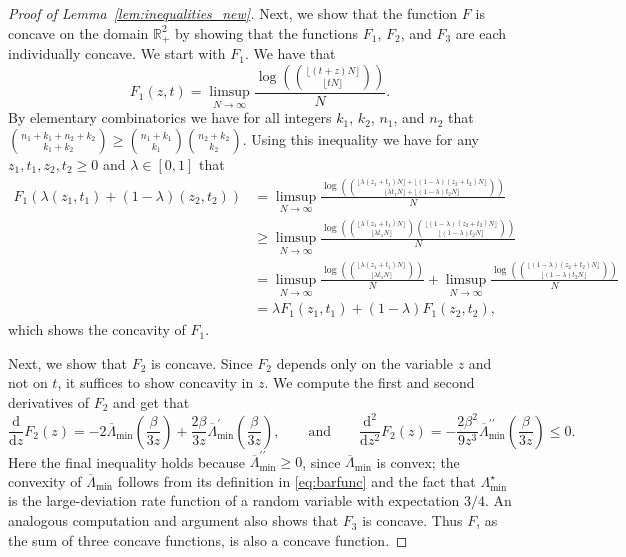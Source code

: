 \documentclass[11pt]{article}
\numberwithin{equation}{section}
\newcommand{\dd}{\mathrm d}
\theoremstyle{definition}
\begin{document}
\begin{proof}[Proof of Lemma~\ref{lem:inequalities_new}]
Next, we show that the function $F$ is concave on the domain $\mathbb{R}_{+}^{2}$ by showing that the functions $F_{1}$, $F_{2}$, and $F_{3}$ are each individually concave. 
We start with $F_{1}$. 
We have that
    \begin{equation*}
        F_1(z,t) = \limsup_{N\to \infty} \frac{\log \left(\binom{\lfloor (t+z)N \rfloor}{\lfloor tN \rfloor} \right)}{N}.
    \end{equation*}
    By elementary combinatorics we have for all integers $k_1$, $k_2$, $n_1$, and $n_2$ that $\binom{n_1+k_1+n_2+k_2}{k_1+k_2} \geq \binom{n_1+k_1}{k_1} \binom{n_2+k_2}{k_2}$. Using this inequality we have for any $z_1,t_1,z_2,t_2 \geq 0$ and $\lambda \in \left[0,1\right]$ that
    \begin{align*}
        F_1 \left( \lambda (z_1,t_1)+ (1-\lambda) (z_2,t_2)  \right)
        &=
        \limsup_{N\to \infty} \frac{\log \left( \binom{\lfloor \lambda (z_1+t_1)N \rfloor + \lfloor(1-\lambda)(z_2+t_2)N \rfloor }{\lfloor \lambda t_1 N \rfloor + \lfloor (1-\lambda) t_2 N \rfloor}\right)}{N}\\
        &\geq
        \limsup_{N\to \infty} \frac{\log \left( \binom{\lfloor \lambda (z_1+t_1)N \rfloor  }{\lfloor \lambda t_1 N \rfloor }
        \binom{ \lfloor(1-\lambda)(z_2+t_2)N \rfloor }{ \lfloor (1-\lambda) t_2 N \rfloor}
        \right)}{N}\\
        &= 
        \limsup_{N\to \infty} \frac{\log \left( \binom{\lfloor \lambda (z_1+t_1)N \rfloor  }{\lfloor \lambda t_1 N \rfloor }
        \right)}{N}
        +
        \limsup_{N\to \infty} \frac{\log \left( \binom{\lfloor (1-\lambda) (z_2+t_2)N \rfloor  }{\lfloor (1-\lambda) t_2 N \rfloor }
        \right)}{N}\\
        &= 
        \lambda F_1(z_1,t_1) + (1-\lambda) F_1(z_2,t_2),
    \end{align*}
    which shows the concavity of $F_1$. 

Next, we show that $F_{2}$ is concave. 
Since $F_{2}$ depends only on the variable $z$ and not on $t$, it suffices to show concavity in $z$. 
We compute the first and second derivatives of $F_{2}$ and get that 
    \begin{equation*}
        \frac{\dd}{\dd z} F_2(z) 
        = 
        -2 \overline{\Lambda}_{\min} \left( \frac{\beta}{3z} \right) + \frac{2\beta}{3z}\overline{\Lambda}_{\min}^\prime \left( \frac{\beta}{3z} \right) ,
        \qquad
        \text{and}
        \qquad 
        \frac{\dd^2}{\dd z^2} F_2(z) 
        = 
        - \frac{2\beta^2}{9 z^3} \overline{\Lambda}_{\min}^{\prime \prime} \left( \frac{\beta}{3z} \right) \leq 0.
    \end{equation*}
Here the final inequality holds because $\overline{\Lambda}_{\min}^{\prime \prime} \geq 0$, since $\overline{\Lambda}_{\min}$ is convex; the convexity of $\overline{\Lambda}_{\min}$ follows from its definition in \eqref{eq:barfunc} and the fact that $\Lambda_{\min}^\star$ is the large-deviation rate function of a random variable with expectation $3/4$.
An analogous computation and argument also shows that $F_{3}$ is concave. 
Thus $F$, as the sum of three concave functions, is also a concave function. 
    

\end{proof}
\end{document}
